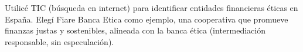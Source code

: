 
%
%
%



\clearpage
{}
Utilicé TIC (búsqueda en internet) para identificar entidades financieras éticas en España. Elegí Fiare Banca Etica como ejemplo, una cooperativa que promueve finanzas justas y sostenibles, alineada con la banca ética (intermediación responsable, sin especulación).


